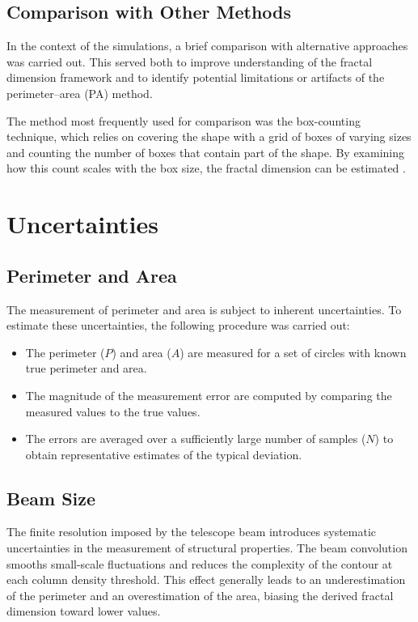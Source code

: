 \subsection{Comparison with Other Methods}

In the context of the simulations, a brief comparison with alternative approaches was carried out. This served both to improve understanding of the fractal dimension framework and to identify potential limitations or artifacts of the perimeter–area (PA) method.

The method most frequently used for comparison was the box-counting technique, which relies on covering the shape with a grid of boxes of varying sizes and counting the number of boxes that contain part of the shape. By examining how this count scales with the box size, the fractal dimension can be estimated \cite{falconer2013fractal}. 

\section{Uncertainties}

\subsection{Perimeter and Area}

The measurement of perimeter and area is subject to inherent uncertainties. To estimate these uncertainties, the following procedure was carried out:

\begin{itemize}
    \item The perimeter ($P$) and area ($A$) are measured for a set of circles with known true perimeter and area.
    \item The magnitude of the measurement error are computed by comparing the measured values to the true values.
    \item The errors are averaged over a sufficiently large number of samples ($N$) to obtain representative estimates of the typical deviation.
\end{itemize}

\subsection{Beam Size}

The finite resolution imposed by the telescope beam introduces systematic uncertainties in the measurement of structural properties. The beam convolution smooths small-scale fluctuations and reduces the complexity of the contour at each column density threshold. This effect generally leads to an underestimation of the perimeter and an overestimation of the area, biasing the derived fractal dimension toward lower values.

